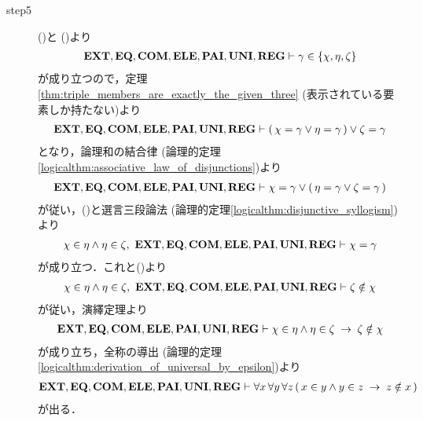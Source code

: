 \begin{sketch}
\begin{description}
			\item[step5] ()と
				()より
				\begin{align}
					\mbox{{\bf EXT}},\mbox{{\bf EQ}},\mbox{\bf COM},\mbox{{\bf ELE}},\mbox{{\bf PAI}},\mbox{{\bf UNI}},\mbox{{\bf REG}} \vdash \gamma \in \{\chi,\eta,\zeta\}
				\end{align}
				が成り立つので，定理\ref{thm:triple_members_are_exactly_the_given_three}
				(表示されている要素しか持たない)より
				\begin{align}
					\mbox{{\bf EXT}},\mbox{{\bf EQ}},\mbox{\bf COM},\mbox{{\bf ELE}},\mbox{{\bf PAI}},\mbox{{\bf UNI}},\mbox{{\bf REG}} \vdash 
					(\, \chi = \gamma \vee \eta = \gamma\, ) \vee \zeta = \gamma
				\end{align}
				となり，論理和の結合律
				(論理的定理\ref{logicalthm:associative_law_of_disjunctions})より
				\begin{align}
					\mbox{{\bf EXT}},\mbox{{\bf EQ}},\mbox{\bf COM},\mbox{{\bf ELE}},\mbox{{\bf PAI}},\mbox{{\bf UNI}},\mbox{{\bf REG}} \vdash 
					\chi = \gamma \vee (\, \eta = \gamma \vee \zeta = \gamma\, )
				\end{align}
				が従い，()と選言三段論法
				(論理的定理\ref{logicalthm:disjunctive_syllogism})より
				\begin{align}
					\chi \in \eta \wedge \eta \in \zeta,\ 
					\EXTAX,\EQAX,\COMAX,\ELEAX,\PAIAX,\UNIAX,\REGAX \vdash \chi = \gamma
				\end{align}
				が成り立つ．これと()より
				\begin{align}
					\chi \in \eta \wedge \eta \in \zeta,\ 
					\EXTAX,\EQAX,\COMAX,\ELEAX,\PAIAX,\UNIAX,\REGAX \vdash \zeta \notin \chi
				\end{align}
				が従い，演繹定理より
				\begin{align}
					\mbox{{\bf EXT}},\mbox{{\bf EQ}},\mbox{\bf COM},\mbox{{\bf ELE}},\mbox{{\bf PAI}},\mbox{{\bf UNI}},\mbox{{\bf REG}} \vdash 
					\chi \in \eta \wedge \eta \in \zeta \hspace{0.25em}\rightarrow\hspace{0.25em} \zeta \notin \chi
				\end{align}
				が成り立ち，全称の導出
				(論理的定理\ref{logicalthm:derivation_of_universal_by_epsilon})より
				\begin{align}
					\mbox{{\bf EXT}},\mbox{{\bf EQ}},\mbox{\bf COM},\mbox{{\bf ELE}},\mbox{{\bf PAI}},\mbox{{\bf UNI}},\mbox{{\bf REG}} \vdash 
					\forall x\, \forall y\, \forall z\, (\, x \in y \wedge y \in z 
					\hspace{0.25em}\rightarrow\hspace{0.25em} z \notin x\, )
				\end{align}
				が出る．
				\QED
		\end{description}
	\end{sketch}